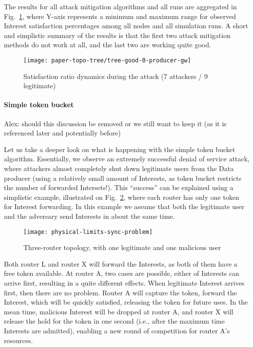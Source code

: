 The results for all attack mitigation algorithms and all runs are aggregated in Fig.~\ref{fig:small-scale attack progress}, where Y-axis represents a minimum and maximum range for observed Interest satisfaction percentages among all nodes and all simulation runs.
A short and simplistic summary of the results is that the first two attack mitigation methods do not work at all, and the last two are working quite good.

\begin{figure}[t]
  \centering
  \texttt{[image: paper-topo-tree/tree-good-0-producer-gw]}
  \caption{Satisfaction ratio dynamics during the attack (7 attackers / 9 legitimate)}
  \label{fig:small-scale attack progress}
\end{figure}

\paragraph{\textbf{Simple token bucket}}

{\color{red}Alex: should this discussion be removed or we still want to keep it (as it is referenced later and potentially before)}

Let us take a deeper look on what is happening with the simple token bucket algorithm.
Essentially, we observe an extremely successful denial of service attack, where attackers almost completely shut down legitimate users from the Data producer (using a relatively small amount of Interests, as token bucket restricts the number of forwarded Intersets!).
This ``success'' can be explained using a simplistic example, illustrated on Fig.~\ref{fig:three router example}, where each router has only one token for Interest forwarding.
In this example we assume that both the legitimate user and the adversary send Interests in about the same time.

\begin{figure}[t]
  \centering
  \texttt{[image: physical-limits-sync-problem]}
  \caption{Three-router topology, with one legitimate and one malicious user}
  \label{fig:three router example}
\end{figure}

Both router L and router X will forward the Interests, as both of them have a free token available.
At router A, two cases are possible, either of Interests can arrive first, resulting in a quite different effects.
When legitimate Interest arrives first, then there are no problem. 
Router A will capture the token, forward the Interest, which will be quickly satisfied, releasing the token for future uses.
In the mean time, malicious Interest will be dropped at router A, and router X will release the hold for the token in one second (i.e., after the maximum time Interests are admitted), enabling a new round of competition for router A's resources.

